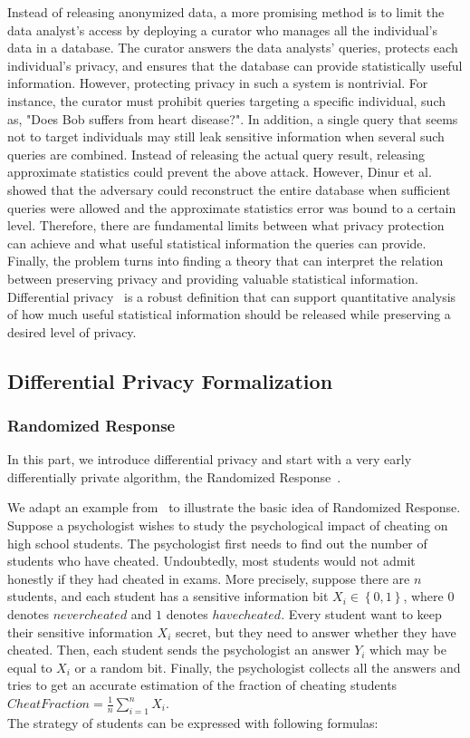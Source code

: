 Instead of releasing anonymized data, a more promising method is to limit the data analyst's access by deploying a curator who manages all the individual's data in a database. The curator answers the data analysts' queries, protects each individual's privacy, and ensures that the database can provide statistically useful information. However, protecting privacy in such a system is nontrivial. For instance, the curator must prohibit queries targeting a specific individual, such as, "Does Bob suffers from heart disease?". In addition, a single query that seems not to target individuals may still leak sensitive information when several such queries are combined. Instead of releasing the actual query result, releasing approximate statistics could prevent the above attack. However, Dinur et al.~\cite{dinur2003revealing} showed that the adversary could reconstruct the entire database when sufficient queries were allowed and the approximate statistics error was bound to a certain level. Therefore, there are fundamental limits between what privacy protection can achieve and what useful statistical information the queries can provide.
Finally, the problem turns into finding a theory that can interpret the relation between preserving privacy and providing valuable statistical information. Differential privacy~\cite{dwork2006differential} is a robust definition that can support quantitative analysis of how much useful statistical information should be released while preserving a desired level of privacy.


\subsection{Differential Privacy Formalization}

\subsubsection{Randomized Response}
\label{subsubsection:randomizedresponse}
In this part, we introduce differential privacy and start with a very early differentially private algorithm, the Randomized Response~\cite{dinur2003revealing}.

We adapt an example from~\cite{KamathLec3AlgorithmsrivateDataAnalysis} to illustrate the basic idea of Randomized Response.
Suppose a psychologist wishes to study the psychological impact of cheating on high school students. The psychologist first needs to find out the number of students who have cheated. Undoubtedly, most students would not admit honestly if they had cheated in exams. More precisely, suppose there are $n$ students, and each student has a sensitive information bit $X_{i}\in \left\{ 0,1\right\} $, where $0$ denotes $never cheated$ and $1$ denotes $have cheated$. Every student want to keep their sensitive information $X_{i}$ secret, but they need to answer whether they have cheated. Then, each student sends the psychologist an answer $Y_{i}$ which may be equal to $X_{i}$ or a random bit. Finally, the psychologist collects all the answers and tries to get an accurate estimation of the fraction of cheating students $CheatFraction=\frac{1}{n}\sum ^{n}_{i=1}X_{i}$. \\
The strategy of students can be expressed with following formulas:

